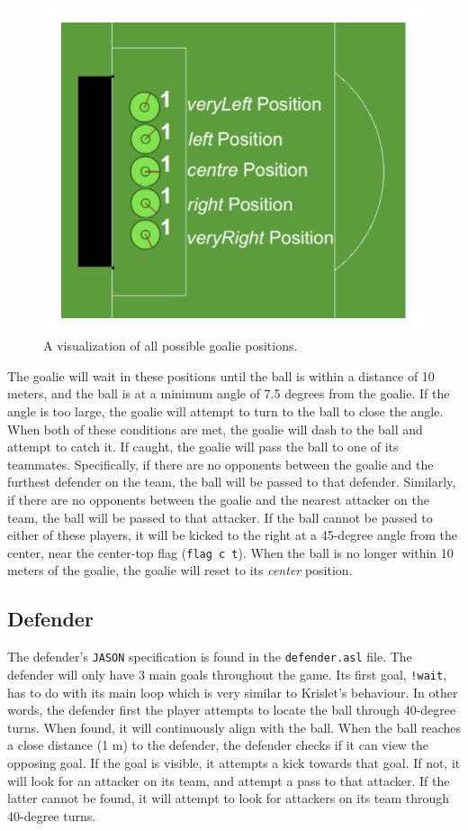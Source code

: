 \documentclass[conference]{IEEEtran}
\begin{document}
\begin{figure}[ht!]
    \centering\centerline{\includegraphics[width=.3\textwidth]{Figures/GoaliePositions.pdf}}
    \caption{A visualization of all possible goalie positions.}
    \label{fig:goaliePositions}
\end{figure}

The goalie will wait in these positions until the ball is within a distance of 10 meters, and the ball is at a minimum angle of 7.5 degrees from the goalie. If the angle is too large, the goalie will attempt to turn to the ball to close the angle. When both of these conditions are met, the goalie will dash to the ball and attempt to catch it. If caught, the goalie will pass the ball to one of its teammates. Specifically, if there are no opponents between the goalie and the furthest defender on the team, the ball will be passed to that defender. Similarly, if there are no opponents between the goalie and the nearest attacker on the team, the ball will be passed to that attacker. If the ball cannot be passed to either of these players, it will be kicked to the right at a 45-degree angle from the center, near the center-top flag (\texttt{flag c t}). When the ball is no longer within 10 meters of the goalie, the goalie will reset to its \textit{center} position.

\subsection{Defender}\label{AA}
The defender's \texttt{JASON} specification is found in the \texttt{defender.asl} file. The defender will only have 3 main goals throughout the game. Its first goal, \texttt{!wait}, has to do with its main loop which is very similar to Krislet's behaviour. In other words, the defender first 
the player attempts to locate the ball through 40-degree turns. When found, it will continuously align with the ball. When the ball reaches a close distance (1 m) to the defender, the defender checks if it can view the opposing goal. If the goal is visible, it attempts a kick towards that goal. If not, it will look for an attacker on its team, and attempt a pass to that attacker. If the latter cannot be found, it will attempt to look for attackers on its team through 40-degree turns.
\end{document}
